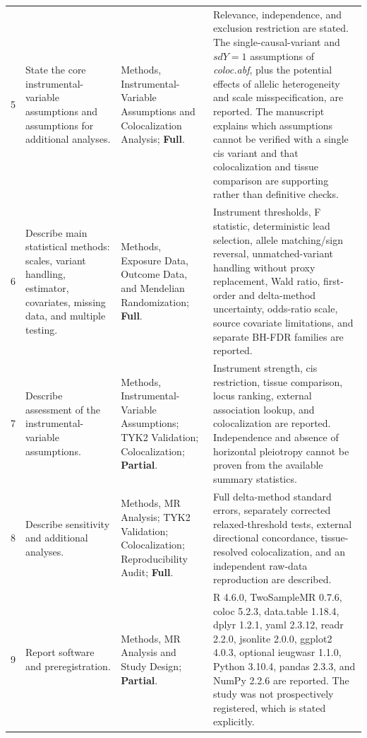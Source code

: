 \documentclass[10pt,a4paper,landscape]{article}
\begin{document}
\begin{longtable}{L{0.8cm}L{5.4cm}L{7.0cm}L{11.0cm}}
5 & State the core instrumental-variable assumptions and assumptions for additional analyses. & Methods, Instrumental-Variable Assumptions and Colocalization Analysis; \textbf{Full}. & Relevance, independence, and exclusion restriction are stated. The single-causal-variant and $sdY=1$ assumptions of \textit{coloc.abf}, plus the potential effects of allelic heterogeneity and scale misspecification, are reported. The manuscript explains which assumptions cannot be verified with a single cis variant and that colocalization and tissue comparison are supporting rather than definitive checks. \\

6 & Describe main statistical methods: scales, variant handling, estimator, covariates, missing data, and multiple testing. & Methods, Exposure Data, Outcome Data, and Mendelian Randomization; \textbf{Full}. & Instrument thresholds, F statistic, deterministic lead selection, allele matching/sign reversal, unmatched-variant handling without proxy replacement, Wald ratio, first-order and delta-method uncertainty, odds-ratio scale, source covariate limitations, and separate BH-FDR families are reported. \\

7 & Describe assessment of the instrumental-variable assumptions. & Methods, Instrumental-Variable Assumptions; TYK2 Validation; Colocalization; \textbf{Partial}. & Instrument strength, cis restriction, tissue comparison, locus ranking, external association lookup, and colocalization are reported. Independence and absence of horizontal pleiotropy cannot be proven from the available summary statistics. \\

8 & Describe sensitivity and additional analyses. & Methods, MR Analysis; TYK2 Validation; Colocalization; Reproducibility Audit; \textbf{Full}. & Full delta-method standard errors, separately corrected relaxed-threshold tests, external directional concordance, tissue-resolved colocalization, and an independent raw-data reproduction are described. \\

9 & Report software and preregistration. & Methods, MR Analysis and Study Design; \textbf{Partial}. & R 4.6.0, TwoSampleMR 0.7.6, coloc 5.2.3, data.table 1.18.4, dplyr 1.2.1, yaml 2.3.12, readr 2.2.0, jsonlite 2.0.0, ggplot2 4.0.3, optional ieugwasr 1.1.0, Python 3.10.4, pandas 2.3.3, and NumPy 2.2.6 are reported. The study was not prospectively registered, which is stated explicitly. \\


\end{longtable}
\end{document}
